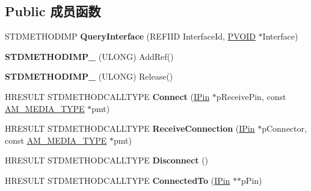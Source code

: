 \subsection*{Public 成员函数}
\begin{DoxyCompactItemize}
\item 
\mbox{\label{class_c_pin_abd9fa93a64f4c254b0d6e9d54010ae94}} 
S\+T\+D\+M\+E\+T\+H\+O\+D\+I\+MP {\bfseries Query\+Interface} (R\+E\+F\+I\+ID Interface\+Id, \hyperlink{interfacevoid}{P\+V\+O\+ID} $\ast$Interface)
\item 
\mbox{\label{class_c_pin_a9edd8792dc153f5fd55c02d1807de4b1}} 
{\bfseries S\+T\+D\+M\+E\+T\+H\+O\+D\+I\+M\+P\+\_\+} (U\+L\+O\+NG) Add\+Ref()
\item 
\mbox{\label{class_c_pin_a85db19db07aaf973572fa87db3034780}} 
{\bfseries S\+T\+D\+M\+E\+T\+H\+O\+D\+I\+M\+P\+\_\+} (U\+L\+O\+NG) Release()
\item 
\mbox{\label{class_c_pin_ae7eff839911338e4a858d4845eeb3dbf}} 
H\+R\+E\+S\+U\+LT S\+T\+D\+M\+E\+T\+H\+O\+D\+C\+A\+L\+L\+T\+Y\+PE {\bfseries Connect} (\hyperlink{interface_i_pin}{I\+Pin} $\ast$p\+Receive\+Pin, const \hyperlink{struct_a_m___m_e_d_i_a___t_y_p_e}{A\+M\+\_\+\+M\+E\+D\+I\+A\+\_\+\+T\+Y\+PE} $\ast$pmt)
\item 
\mbox{\label{class_c_pin_a8a40e007c257c52bc2dfee133f2ec895}} 
H\+R\+E\+S\+U\+LT S\+T\+D\+M\+E\+T\+H\+O\+D\+C\+A\+L\+L\+T\+Y\+PE {\bfseries Receive\+Connection} (\hyperlink{interface_i_pin}{I\+Pin} $\ast$p\+Connector, const \hyperlink{struct_a_m___m_e_d_i_a___t_y_p_e}{A\+M\+\_\+\+M\+E\+D\+I\+A\+\_\+\+T\+Y\+PE} $\ast$pmt)
\item 
\mbox{\label{class_c_pin_a0db6e6eb63f82ced5da3cde46b068990}} 
H\+R\+E\+S\+U\+LT S\+T\+D\+M\+E\+T\+H\+O\+D\+C\+A\+L\+L\+T\+Y\+PE {\bfseries Disconnect} ()
\item 
\mbox{\label{class_c_pin_a0a8f2b9f60ba4585bc0b4c265597f77b}} 
H\+R\+E\+S\+U\+LT S\+T\+D\+M\+E\+T\+H\+O\+D\+C\+A\+L\+L\+T\+Y\+PE {\bfseries Connected\+To} (\hyperlink{interface_i_pin}{I\+Pin} $\ast$$\ast$p\+Pin)
\item 
\mbox{\label{class_c_pin_ae365d593a8e9c9ecb564ff00ec5f9f06}} 
$$
\end{DoxyCompactItemize}
